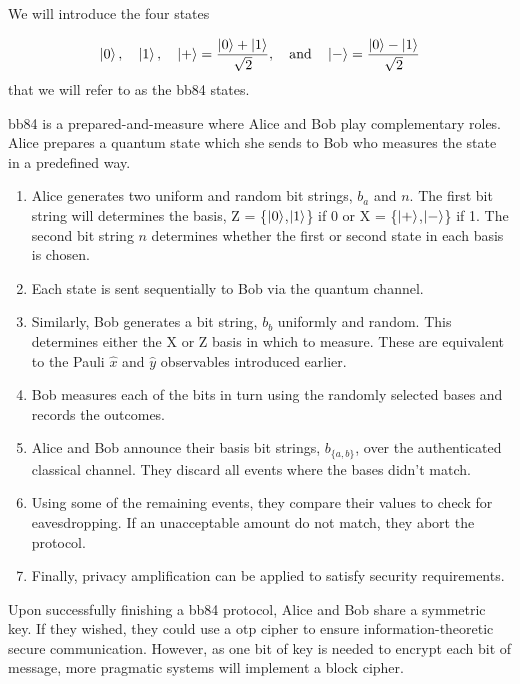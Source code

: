 We will introduce the four states

\begin{equation}
	\ket{0}, \quad \ket{1}, \quad \ket{+} = \frac{\ket{0} + \ket{1}}{\sqrt{2}}, \quad \text{and} \quad \ket{-} = \frac{\ket{0} - \ket{1}}{\sqrt{2}}
\end{equation}
that we will refer to as the \ac{bb84} states.

\Ac{bb84} is a {\color{bristol-red}prepared-and-measure} where Alice and Bob play complementary roles. Alice {\color{bristol-red}prepares} a quantum state which she sends to Bob who {\color{bristol-red}measures} the state in a predefined way. 

\begin{algorithm}
\begin{enumerate}
	\item Alice generates two uniform and random bit strings, $b_a$ and $n$. The first bit string will determines the basis, Z = \{$\ket{0}$,$\ket{1}$\} if 0 or X =  \{$\ket{+}$,$\ket{-}$\} if 1. The second bit string $n$ determines whether the first or second state in each basis is chosen. 
	\item Each state is sent sequentially to Bob via the quantum channel.
	\item Similarly, Bob generates a bit string, $b_b$ uniformly and random. This determines either the X or Z basis in which to measure. These are equivalent to the Pauli $\hat{x}$ and $\hat{y}$ observables introduced earlier.
	\item Bob measures each of the bits in turn using the randomly selected bases and records the outcomes.
	\item Alice and Bob announce their basis bit strings, $b_{\{a,b\}}$, over the authenticated classical channel. They discard all events where the bases didn't match.
	\item Using some of the remaining events, they compare their values to check for eavesdropping. If an unacceptable amount do not match, they abort the protocol.
	\item Finally, privacy amplification can be applied to satisfy security requirements.
\end{enumerate}
\end{algorithm}

Upon successfully finishing a \ac{bb84} protocol, Alice and Bob share a symmetric key. If they wished, they could use a \ac{otp} cipher to ensure information-theoretic secure communication. However, as one bit of key is needed to encrypt each bit of message, more pragmatic systems will implement a block cipher. 

